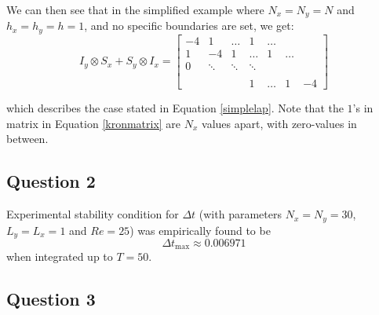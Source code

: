 \documentclass[10pt]{report}
\begin{document}
We can then see that in the simplified example where $N_x = N_y = N$ and $h_x = h_y = h = 1$, and no specific boundaries are set, we get:
\begin{equation}
    I_y \otimes S_x + S_y \otimes I_x = \begin{bmatrix}
        -4&1&\hdots&1&\hdots\\
        1&-4&1&\hdots&1&\hdots\\
        0 &\ddots&\ddots &\ddots \\\\
        &&&1&\hdots&1&-4
    \end{bmatrix} \label{kronmatrix}
\end{equation}

which describes the case stated in Equation \ref{simplelap}. Note that the $1$'s in matrix in Equation \ref{kronmatrix} are $N_x$ 
values apart, with zero-values in between.
\subsection*{Question 2}
Experimental stability condition for $\Delta t$ 
(with parameters $N_x = N_y = 30$, $L_y = L_x = 1$ and $Re = 25$) was empirically found to be
\[
\Delta t_{\text{max}} \approx 0.006971
\]
when integrated up to $T = 50$.

\subsection*{Question 3}
\end{document}

